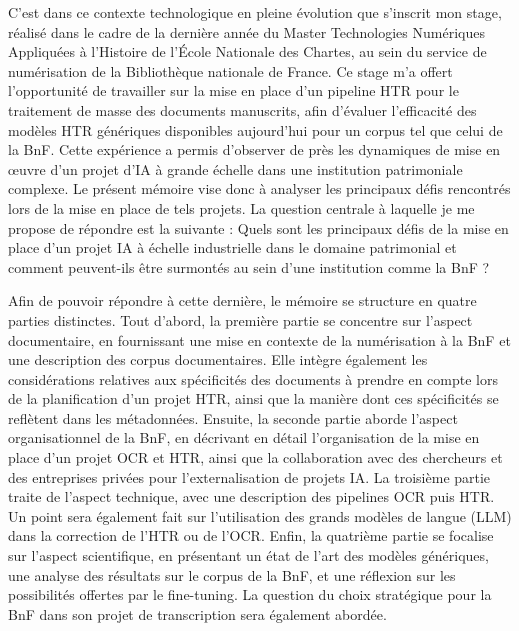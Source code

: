 \documentclass[a4paper,12pt,twoside]{book}
\begin{document}
C’est dans ce contexte technologique en pleine évolution que s’inscrit
mon stage, réalisé dans le cadre de la dernière année du Master Technologies
Numériques Appliquées à l’Histoire de l’École Nationale des Chartes, au sein
du service de numérisation de la Bibliothèque nationale de France. Ce
stage m’a offert l’opportunité de travailler sur la mise en place d’un pipeline
HTR pour le traitement de masse des documents manuscrits, afin d’évaluer
l’efficacité des modèles HTR génériques disponibles aujourd’hui pour un
corpus tel que celui de la BnF. Cette expérience a permis d’observer de près les
dynamiques de mise en œuvre d’un projet d’IA à grande échelle dans une
institution patrimoniale complexe. Le présent mémoire vise donc à analyser les
principaux défis rencontrés lors de la mise en place de tels projets. La question
centrale à laquelle je me propose de répondre est la suivante : Quels sont les
principaux défis de la mise en place d’un projet IA à échelle industrielle dans le
domaine patrimonial et comment peuvent-ils être surmontés au sein d’une
institution comme la BnF ?

Afin de pouvoir répondre à cette dernière, le mémoire se structure en
quatre parties distinctes. Tout d’abord, la première partie se concentre sur
l’aspect documentaire, en fournissant une mise en contexte de la numérisation
à la BnF et une description des corpus documentaires. Elle intègre également
les considérations relatives aux spécificités des documents à prendre en
compte lors de la planification d’un projet HTR, ainsi que la manière dont ces
spécificités se reflètent dans les métadonnées. Ensuite, la seconde partie
aborde l’aspect organisationnel de la BnF, en décrivant en détail l’organisation
de la mise en place d’un projet OCR et HTR, ainsi que la collaboration avec des
chercheurs et des entreprises privées pour l’externalisation de projets IA. La troisième partie traite de l’aspect technique, avec une description des pipelines
OCR puis HTR. Un point sera également fait sur l’utilisation des grands modèles
de langue (LLM) dans la correction de l’HTR ou de l’OCR. Enfin, la quatrième
partie se focalise sur l’aspect scientifique, en présentant un état de l’art des
modèles génériques, une analyse des résultats sur le corpus de la BnF, et une
réflexion sur les possibilités offertes par le fine-tuning. La question du choix
stratégique pour la BnF dans son projet de transcription sera également
abordée.

\newpage{\pagestyle{empty}\cleardoublepage}

	\mainmatter
\end{document}
